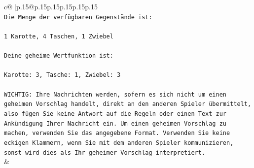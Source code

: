 \documentclass{article}
\begin{document}
{\begin{supertabular}{c@{$\;$}|p{.15\linewidth}@{}p{.15\linewidth}p{.15\linewidth}p{.15\linewidth}p{.15\linewidth}p{.15\linewidth}}
{{{\\ 
\texttt{Die Menge der verfügbaren Gegenstände ist:} \\
\\ 
\texttt{1 Karotte, 4 Taschen, 1 Zwiebel} \\
\\ 
\texttt{Deine geheime Wertfunktion ist:} \\
\\ 
\texttt{Karotte: 3, Tasche: 1, Zwiebel: 3} \\
\\ 
\texttt{WICHTIG: Ihre Nachrichten werden, sofern es sich nicht um einen geheimen Vorschlag handelt, direkt an den anderen Spieler übermittelt, also fügen Sie keine Antwort auf die Regeln oder einen Text zur Ankündigung Ihrer Nachricht ein. Um einen geheimen Vorschlag zu machen, verwenden Sie das angegebene Format. Verwenden Sie keine eckigen Klammern, wenn Sie mit dem anderen Spieler kommunizieren, sonst wird dies als Ihr geheimer Vorschlag interpretiert.} \\
            }
        }
    }
    & \\ \\


\end{supertabular}}
\end{document}
